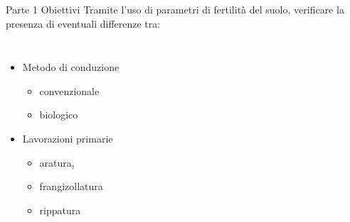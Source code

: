 \documentclass[xcolor={usenames, table, x11names}, final, 10pt]{beamer}
\begin{document}
\begin{frame}{Parte 1 \small{Obiettivi}}
  Tramite l'uso di parametri di fertilità del suolo, verificare la
  presenza di eventuali differenze tra:
  \begin{columns}[c]
    \begin{itemize}
    \item<2-> Metodo di conduzione
      \begin{itemize}
      \item <2->      convenzionale
      \item <2->      biologico
      \end{itemize}
    \item<3-> Lavorazioni primarie
      \begin{itemize}
      \item <3->      aratura, 
      \item <3->      frangizollatura
      \item <3->      rippatura        
      \end{itemize}
    \end{itemize}
  \end{columns}
\end{frame}
\end{document}
